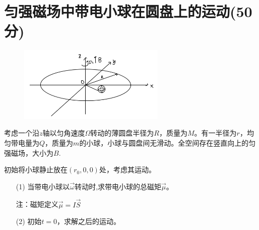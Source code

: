 \documentclass{article}
\begin{document}
\section*{匀强磁场中带电小球在圆盘上的运动(50分)}
\begin{figure}
	\vspace{-15pt}    %
	\includegraphics[width=7cm]{img/1.jpeg}\\
	\vspace{-15pt}    %
	\caption{}
	\vspace{-15pt}    %
\end{figure}
考虑一个沿$z$轴以匀角速度$\Omega$转动的薄圆盘半径为$R$，质量为$M$。有一半径为$r$，均匀带电量为$Q$，质量为$m$的小球，小球与圆盘间无滑动。全空间存在竖直向上的匀强磁场，大小为$B$.\par
初始将小球静止放在$(r_0,0,0)$处，考虑其运动。\par
\begin{itemize}
\item[(1)]当带电小球以$\vec{\omega}$转动时,求带电小球的总磁矩$\vec{\mu}$。\par
注：磁矩定义$\vec{\mu}=I\vec{S}$\par
\item[(2)]初始$t=0$，求解之后的运动。
\end{itemize}
\end{document}
